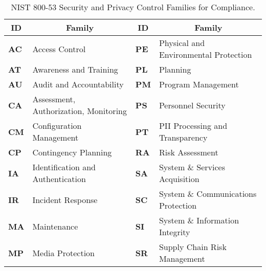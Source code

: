 \begin{table}[h]
\centering
\caption{NIST 800-53 Security and Privacy Control Families for Compliance.}
\label{tab:nistteighthundredff}
\begin{tabular}{|l|p{16em}|l|p{16em}|}
\hline
\multicolumn{1}{|c|}{\textbf{ID}} & \multicolumn{1}{c|}{\textbf{Family}} & \multicolumn{1}{c|}{\textbf{ID}} & \multicolumn{1}{c|}{\textbf{Family}} \\ \hline
{\textbf{AC}} & Access Control                            & {\textbf{PE}} & Physical and Environmental Protection \\ \hline
{\textbf{AT}} & Awareness and Training                    & {\textbf{PL}} & Planning                              \\ \hline
{\textbf{AU}} & Audit and Accountability                  & {\textbf{PM}} & Program Management                    \\ \hline
{\textbf{CA}} & Assessment, Authorization, Monitoring     & {\textbf{PS}} & Personnel Security                    \\ \hline
{\textbf{CM}} & Configuration Management                  & {\textbf{PT}} & PII Processing and Transparency       \\ \hline
{\textbf{CP}} & Contingency Planning                      & {\textbf{RA}} & Risk Assessment                       \\ \hline
{\textbf{IA}} & Identification and Authentication         & {\textbf{SA}} & System \& Services Acquisition        \\ \hline
{\textbf{IR}} & Incident Response                         & {\textbf{SC}} & System \& Communications Protection   \\ \hline
{\textbf{MA}} & Maintenance                               & {\textbf{SI}} & System \& Information Integrity       \\ \hline
{\textbf{MP}} & Media Protection                          & {\textbf{SR}} & Supply Chain Risk Management          \\ \hline
\end{tabular}
\end{table}
